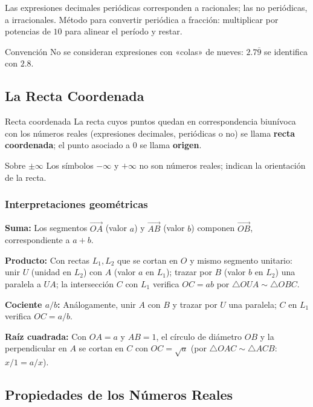 \documentclass[12pt]{article}
\begin{document}
Las expresiones decimales periódicas corresponden a racionales; las no periódicas, a irracionales. Método para convertir periódica a fracción: multiplicar por potencias de $10$ para alinear el período y restar.

\begin{observacion}[]{Convención}
No se consideran expresiones con «colas» de nueves: $2.7\overline{9}$ se identifica con $2.8$.
\end{observacion}

\subsection{La Recta Coordenada}

\begin{definicion}[]{Recta coordenada}
La recta cuyos puntos quedan en correspondencia biunívoca con los números reales (expresiones decimales, periódicas o no) se llama \textbf{recta coordenada}; el punto asociado a $0$ se llama \textbf{origen}.
\end{definicion}

\begin{nota}[]{Sobre $\pm\infty$}
Los símbolos $-\infty$ y $+\infty$ no son números reales; indican la orientación de la recta.
\end{nota}

\subsubsection{Interpretaciones geométricas}

\textbf{Suma:} Los segmentos $\overrightarrow{OA}$ (valor $a$) y $\overrightarrow{AB}$ (valor $b$) componen $\overrightarrow{OB}$, correspondiente a $a+b$.

\textbf{Producto:} Con rectas $L_1, L_2$ que se cortan en $O$ y mismo segmento unitario: unir $U$ (unidad en $L_2$) con $A$ (valor $a$ en $L_1$); trazar por $B$ (valor $b$ en $L_2$) una paralela a $UA$; la intersección $C$ con $L_1$ verifica $OC = ab$ por $\triangle OUA \sim \triangle OBC$.

\textbf{Cociente $a/b$:} Análogamente, unir $A$ con $B$ y trazar por $U$ una paralela; $C$ en $L_1$ verifica $OC = a/b$.

\textbf{Raíz cuadrada:} Con $OA = a$ y $AB = 1$, el círculo de diámetro $OB$ y la perpendicular en $A$ se cortan en $C$ con $OC = \sqrt{a}$ (por $\triangle OAC \sim \triangle ACB$: $x/1 = a/x$).

\subsection{Propiedades de los Números Reales}
\end{document}
